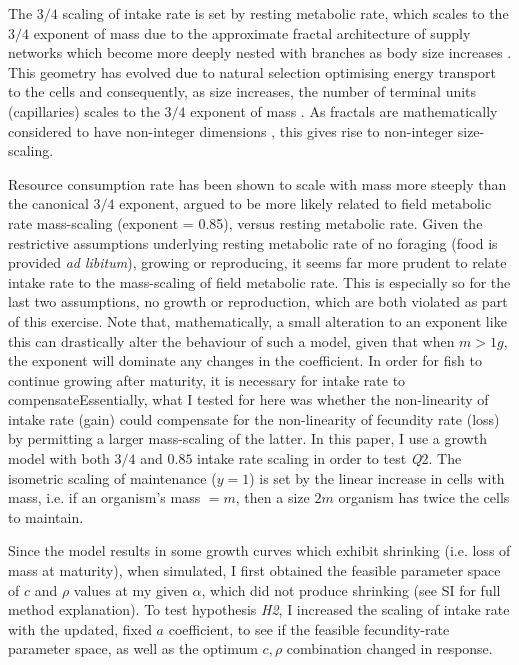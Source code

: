 \documentclass[a4paper]{article} %
\begin{document}
The $3/4$ scaling of intake rate is set by resting metabolic rate, which scales to the $3/4$ exponent of mass \autocite{Kleiber1947, peters1983, niklas1994plant} due to the approximate fractal architecture of supply networks which become more deeply nested with branches as body size increases \autocite{West1997}. This geometry has evolved due to natural selection optimising energy transport to the cells and consequently, as size increases, the number of terminal units (capillaries) scales to the $3/4$ exponent of mass \autocite{West1997, West2005}. As fractals are mathematically considered to have non-integer dimensions \autocite{Hausdorff1918, Mandelbrot1982}, this gives rise to non-integer size-scaling. 

Resource consumption rate has been shown to scale with mass more steeply than the canonical $3/4$ exponent, argued to be more likely related to field metabolic rate mass-scaling (exponent = 0.85), versus resting metabolic rate. Given the restrictive assumptions underlying resting metabolic rate of no foraging (food is provided \textit{ad libitum}), growing or reproducing, it seems far more prudent to relate intake rate to the mass-scaling of field metabolic rate. This is especially so for the last two assumptions, no growth or reproduction, which are both violated as part of this exercise. Note that, mathematically, a small alteration to an exponent like this can drastically alter the behaviour of such a model, given that when $m > 1 g$, the exponent will dominate any changes in the coefficient. In order for fish to continue growing after maturity, it is necessary for intake rate to compensateEssentially, what I tested for here was whether the non-linearity of intake rate (gain) could compensate for the non-linearity of fecundity rate (loss) by permitting a larger mass-scaling of the latter.
 In this paper, I use a growth model with both $3/4$ and $0.85$ intake rate scaling in order to test \textit{Q}2. The isometric scaling of maintenance ($y = 1$) is set by the linear increase in cells with mass, i.e. if an organism's mass $= m$, then a size $2m$ organism has twice the cells to maintain.

Since the model results in some growth curves which exhibit shrinking (i.e. loss of mass at maturity), when simulated, I first obtained the feasible parameter space of $c$ and $\rho$ values at my given $\alpha$, which did not produce shrinking (see SI for full method explanation). To test hypothesis \textit{H2}, I increased the scaling of intake rate with the updated, fixed $a$ coefficient, to see if the feasible fecundity-rate parameter space, as well as the optimum $c, \rho$ combination changed in response.
\end{document}
